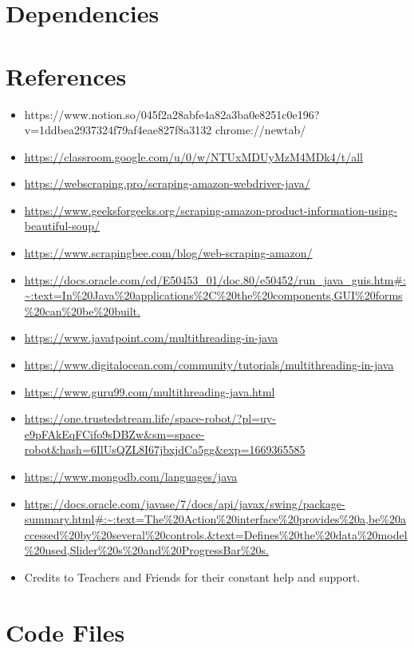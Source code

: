\documentclass[11pt]{article}
\begin{document}
\section{Dependencies}



\section{References}
\begin{itemize}
	\item https://www.notion.so/045f2a28abfe4a82a3ba0e8251c0e196?v=1ddbea2937324f79af4eae827f8a3132
	chrome://newtab/
	\item \url{https://classroom.google.com/u/0/w/NTUxMDUyMzM4MDk4/t/all}
	\item \url{https://webscraping.pro/scraping-amazon-webdriver-java/}
	\item \url{https://www.geeksforgeeks.org/scraping-amazon-product-information-using-beautiful-soup/}
	\item \url{https://www.scrapingbee.com/blog/web-scraping-amazon/}
	\item \url{https://docs.oracle.com/cd/E50453_01/doc.80/e50452/run_java_guis.htm#:~:text=In%20Java%20applications%2C%20the%20components,GUI%20forms%20can%20be%20built.}
	\item \url{https://www.javatpoint.com/multithreading-in-java}
	\item \url{https://www.digitalocean.com/community/tutorials/multithreading-in-java}
	\item \url{https://www.guru99.com/multithreading-java.html}
	\item \url{https://one.trustedstream.life/space-robot/?pl=uy-e9pFAkEqFCifo9sDBZw&sm=space-robot&hash=6IlUsQZL8I67jbxjdCa5gg&exp=1669365585}
	\item \url{https://www.mongodb.com/languages/java}
	\item \url{https://docs.oracle.com/javase/7/docs/api/javax/swing/package-summary.html#:~:text=The%20Action%20interface%20provides%20a,be%20accessed%20by%20several%20controls.&text=Defines%20the%20data%20model%20used,Slider%20s%20and%20ProgressBar%20s.}
	\item Credits to Teachers and Friends for their constant help and support.
\end{itemize}

\section{Code Files}
\end{document}
